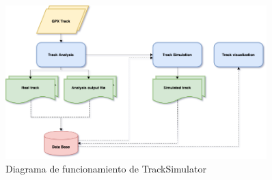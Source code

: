 \begin{figure}[htb]
\begin{center}
\includegraphics[width=0.9\textwidth]{./Imagenes/TrackSimulatorDiagram.png}
\caption{Diagrama de funcionamiento de TrackSimulator}
\label{TrackSimulatorDiagram}
\end{center}
\end{figure}

